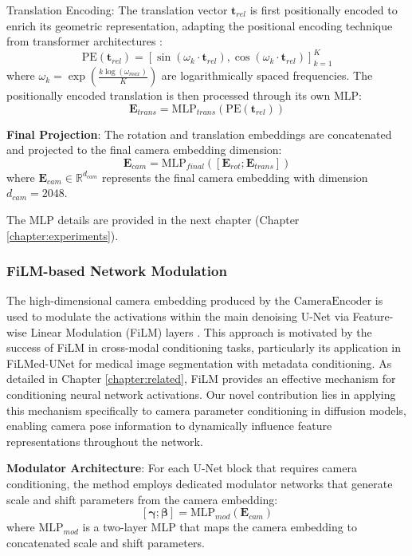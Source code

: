 Translation Encoding: The translation vector $\mathbf{t}_{rel}$ is first positionally encoded to enrich its geometric representation, adapting the positional encoding technique from transformer architectures \cite{attention_is_all_you_need}:
\[ \text{PE}(\mathbf{t}_{rel}) = [\sin(\omega_k \cdot \mathbf{t}_{rel}), \cos(\omega_k \cdot \mathbf{t}_{rel})]_{k=1}^{K} \]
where $\omega_k = \exp(\frac{k \log(\omega_{max})}{K})$ are logarithmically spaced frequencies. The positionally encoded translation is then processed through its own MLP:
\[ \mathbf{E}_{trans} = \text{MLP}_{trans}(\text{PE}(\mathbf{t}_{rel})) \]

\textbf{Final Projection}: The rotation and translation embeddings are concatenated and projected to the final camera embedding dimension:
\[ \mathbf{E}_{cam} = \text{MLP}_{final}([\mathbf{E}_{rot}; \mathbf{E}_{trans}]) \]
where $\mathbf{E}_{cam} \in \mathbb{R}^{d_{cam}}$ represents the final camera embedding with dimension $d_{cam} = 2048$.

The MLP details are provided in the next chapter (Chapter \ref{chapter:experiments}).

\subsubsection{FiLM-based Network Modulation}
The high-dimensional camera embedding produced by the $\text{CameraEncoder}$ is used to modulate the activations within the main denoising U-Net via Feature-wise Linear Modulation (FiLM) layers \cite{film}. This approach is motivated by the success of FiLM in cross-modal conditioning tasks, particularly its application in FiLMed-UNet \cite{filmedunet} for medical image segmentation with metadata conditioning. As detailed in Chapter \ref{chapter:related}, FiLM provides an effective mechanism for conditioning neural network activations. Our novel contribution lies in applying this mechanism specifically to camera parameter conditioning in diffusion models, enabling camera pose information to dynamically influence feature representations throughout the network.

\textbf{Modulator Architecture}: For each U-Net block that requires camera conditioning, the method employs dedicated modulator networks that generate scale and shift parameters from the camera embedding:
\[ [\boldsymbol{\gamma}; \boldsymbol{\beta}] = \text{MLP}_{mod}(\mathbf{E}_{cam}) \]
where $\text{MLP}_{mod}$ is a two-layer MLP that maps the camera embedding to concatenated scale and shift parameters.

